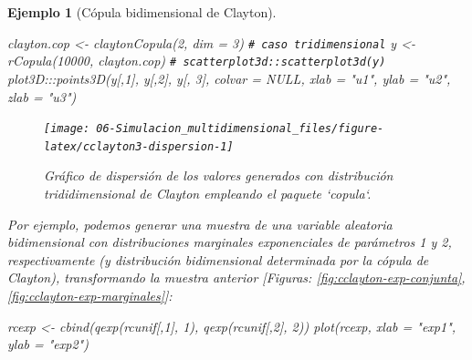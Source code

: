 \documentclass[
]{book}
\newenvironment{Shaded}{\begin{snugshade}}{\end{snugshade}}
\newcommand{\AttributeTok}[1]{\textcolor[rgb]{0.77,0.63,0.00}{#1}}
\newcommand{\CommentTok}[1]{\textcolor[rgb]{0.56,0.35,0.01}{\textit{#1}}}
\newcommand{\ConstantTok}[1]{\textcolor[rgb]{0.00,0.00,0.00}{#1}}
\newcommand{\DecValTok}[1]{\textcolor[rgb]{0.00,0.00,0.81}{#1}}
\newcommand{\FunctionTok}[1]{\textcolor[rgb]{0.00,0.00,0.00}{#1}}
\newcommand{\NormalTok}[1]{#1}
\newcommand{\OtherTok}[1]{\textcolor[rgb]{0.56,0.35,0.01}{#1}}
\newcommand{\SpecialCharTok}[1]{\textcolor[rgb]{0.00,0.00,0.00}{#1}}
\newcommand{\StringTok}[1]{\textcolor[rgb]{0.31,0.60,0.02}{#1}}
\theoremstyle{break}
\newtheorem{example}{Ejemplo}[chapter]
\theoremstyle{nonumberplain}
\renewcommand{\CommentTok}[1]{\textcolor[rgb]{0.41,0.41,0.41}{\texttt{#1}}}
\begin{document}
\begin{example}[Cópula bidimensional de Clayton]
\begin{Shaded}
\begin{Highlighting}[]
\NormalTok{clayton.cop }\OtherTok{\textless{}{-}} \FunctionTok{claytonCopula}\NormalTok{(}\DecValTok{2}\NormalTok{, }\AttributeTok{dim =} \DecValTok{3}\NormalTok{) }\CommentTok{\# caso tridimensional}
\NormalTok{y }\OtherTok{\textless{}{-}} \FunctionTok{rCopula}\NormalTok{(}\DecValTok{10000}\NormalTok{, clayton.cop)}
\CommentTok{\# scatterplot3d::scatterplot3d(y)}
\NormalTok{plot3D}\SpecialCharTok{:::}\FunctionTok{points3D}\NormalTok{(y[,}\DecValTok{1}\NormalTok{], y[,}\DecValTok{2}\NormalTok{], y[, }\DecValTok{3}\NormalTok{], }\AttributeTok{colvar =} \ConstantTok{NULL}\NormalTok{, }
                  \AttributeTok{xlab =} \StringTok{"u1"}\NormalTok{, }\AttributeTok{ylab =} \StringTok{"u2"}\NormalTok{, }\AttributeTok{zlab =} \StringTok{"u3"}\NormalTok{) }
\end{Highlighting}
\end{Shaded}

\begin{figure}[!htb]

{\centering \texttt{[image: 06-Simulacion\_multidimensional\_files/figure-latex/cclayton3-dispersion-1]} 

}

\caption{Gráfico de dispersión de los valores generados con distribución trididimensional de Clayton empleando el paquete `copula`.}\label{fig:cclayton3-dispersion}
\end{figure}

Por ejemplo, podemos generar una muestra de una variable aleatoria bidimensional con distribuciones marginales exponenciales de parámetros 1 y 2, respectivamente (y distribución bidimensional determinada por la cópula de Clayton), transformando la muestra anterior {[}Figuras: \ref{fig:cclayton-exp-conjunta}, \ref{fig:cclayton-exp-marginales}{]}:

\begin{Shaded}
\begin{Highlighting}[]
\NormalTok{rcexp }\OtherTok{\textless{}{-}} \FunctionTok{cbind}\NormalTok{(}\FunctionTok{qexp}\NormalTok{(rcunif[,}\DecValTok{1}\NormalTok{], }\DecValTok{1}\NormalTok{), }\FunctionTok{qexp}\NormalTok{(rcunif[,}\DecValTok{2}\NormalTok{], }\DecValTok{2}\NormalTok{))}
\FunctionTok{plot}\NormalTok{(rcexp, }\AttributeTok{xlab =} \StringTok{"exp1"}\NormalTok{, }\AttributeTok{ylab =} \StringTok{"exp2"}\NormalTok{)  }
\end{Highlighting}
\end{Shaded}


\end{example}
\end{document}
